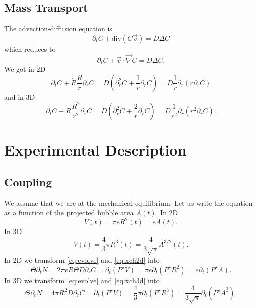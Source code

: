 \documentclass[11pt]{revtex4}
\begin{document}
\subsection{Mass Transport}
The advection-diffusion equation is
\begin{equation}
	\label{eq:transport0}
	\partial_t C + \mathrm{div}(C\vec{v}) = D \Delta C
\end{equation}
which reduces to
\begin{equation}
	\label{eq:transport}
	\partial_t C + \vec{v}\cdot\vec{\nabla}C = D \Delta C.
\end{equation}
We got in 2D
\begin{equation}
	\label{eq:trn2d}
	\partial_t C + \dot{R} \dfrac{R}{r} \partial_r C = D\left(\partial_r^2 C + \dfrac{1}{r} \partial_r C \right) = D \dfrac{1}{r}\partial_r\left(r\partial_r C\right)
\end{equation}
and in 3D
\begin{equation}
	\label{eq:trn3d}
	\partial_t C + \dot{R}\dfrac{R^2}{r^2} \partial_r C = D\left(\partial_r^2 C + \dfrac{2}{r} \partial_r C \right) 
	= D \dfrac{1}{r^2}\partial_r\left(r^2\partial_r C\right).
\end{equation}


\section{Experimental Description}
\subsection{Coupling}
We assume that we are at the mechanical equilibrium.
Let us write the equation as a function of the projected bubble area $A(t)$.
In 2D
\begin{equation}
	V(t)  = \pi e R^2(t) = eA(t) .
\end{equation}
In 3D
\begin{equation}
	V(t) = \dfrac{4}{3}\pi R^3(t) = \dfrac{4}{3\sqrt{\pi}} A^{3/2}(t).
\end{equation}
In 2D we transform \eqref{eq:evolve} and \eqref{eq:xch2d} into
\begin{equation}
	\label{eq:matter2D}
	\Theta \partial_t N = 	2\pi e R \Theta D \partial_r C  = \partial_t \left(P^\star V\right) = \pi e \partial_t \left(P^\star R^2\right) = e \partial_t \left(P^\star A\right).
\end{equation}
In 3D we transform \eqref{eq:evolve} and \eqref{eq:xch3d} into
\begin{equation}
	\label{eq:matter3D}
	\Theta \partial_t N = 4\pi R^2 D \partial_r C = \partial_t \left(P^\star V\right) = \dfrac{4}{3}\pi \partial_t \left(P^\star R^3\right) = \dfrac{4}{3\sqrt{\pi}} \partial_t \left(P^\star A^{\frac{3}{2}}\right).
\end{equation}
\end{document}
